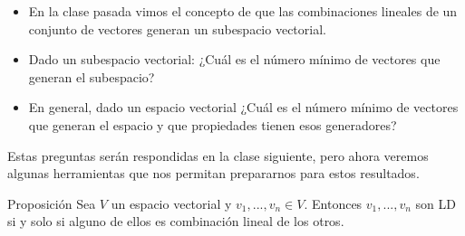 \documentclass[handout]{beamer} %
\begin{document}
\begin{frame}
\begin{itemize}
\item En  la clase pasada vimos el concepto de que las combinaciones lineales de un conjunto de vectores generan un subespacio vectorial.\pause
\item Dado un subespacio vectorial: ¿Cuál es el  número mínimo de vectores que generan el subespacio?
\item En  general, dado un espacio vectorial ¿Cuál es el  número mínimo de vectores que generan el espacio y que propiedades tienen esos generadores?\pause

\end{itemize}
\vskip 1cm\pause
Estas preguntas serán respondidas en la clase siguiente,  pero ahora veremos algunas herramientas que nos permitan prepararnos para estos resultados.   
\end{frame}  







\begin{frame}

\begin{block}{Proposición}
Sea $V$ un espacio vectorial y $v_1, ..., v_n\in V$. Entonces $v_1, ..., v_n$ son LD si y solo si alguno de ellos es combinación lineal de los otros.
\end{block}\pause


\end{frame}
\end{document}
